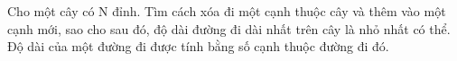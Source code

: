 Cho một cây có N đỉnh. Tìm cách xóa đi một cạnh thuộc   cây và thêm vào một cạnh mới, sao cho sau đó, độ dài đường   đi dài nhất trên cây là nhỏ nhất có thể. Độ dài của một đường   đi được tính bằng số cạnh thuộc đường đi đó.  

\